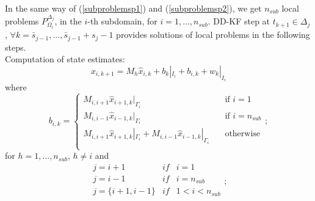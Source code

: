 \documentclass[smallcondensed]{svjour3}
\begin{document}
\noindent In the same way of (\ref{subproblemsp1}) and (\ref{subproblemsp2}), we get $n_{sub}$ local problems $P^{\Delta_j}_{\Omega_i}$, in the $i$-th subdomain, for $i=1,\ldots, n_{sub}$.  DD-KF step  at $t_{k+1}\in \Delta_{j}$, $\forall k=\bar{s}_{j-1},\ldots,\bar{s}_{j-1}+s_{j}-1$ provides  solutions of local problems   in the following steps.\\ 
\noindent Computation of state estimates:
\begin{equation*}
    x_{i,k+1}=M_h\widehat{x}_{i,k}+b_k|_{I_i}+b_{i,k}+w_k|_{I_{i}}
\end{equation*}
where 
\begin{equation*}
    b_{i,k}=\left\{\begin{array}{ll}
   M_{i,i+1}\widehat{x}_{i+1,k}|_{\Gamma_i} \quad &\textrm{if $i=1$}\\
   M_{i,i-1}\widehat{x}_{i-1,k}|_{\Gamma_i} \quad &\textrm{if $i=n_{sub}$}\\
 M_{i,i+1}\widehat{x}_{i+1,k}|_{\Gamma_i}+M_{i,i-1}\widehat{x}_{i-1,k}|_{\Gamma_i} \quad &\textrm{otherwise}\\
    \end{array}\right.;
\end{equation*}
for $h=1,\ldots,n_{sub}$, $h\neq i$ and \begin{equation}
\begin{array}{lll}
j=i+1 &if & i=1\\
j=i-1&  if& i=n_{sub}\\
j=\{i+1,i-1\} & if& 1<i<n_{sub}\\
\end{array};
\end{equation}
\end{document}
